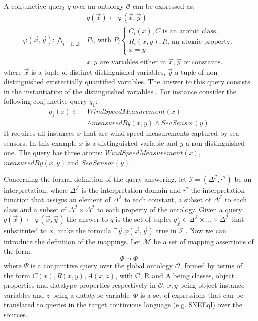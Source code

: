 A conjunctive query $q$ over an ontology $\mathcal{O}$ can be expressed as:
\begin{align*}
&q(\vec{x}) \leftarrow \varphi(\vec{x},\vec{y}) \\
%
\varphi(\vec{x},\vec{y}):\underset{i=1...k}{\bigwedge} & P_i \mbox{, with } P_i \begin{cases} C_i(x),   C \mbox{ is an atomic class. } \\
  R_i(x,y),   R_i \mbox{ an atomic property.}\\ x=y
\end{cases}
\\& x,y \mbox{ are variables either in $\vec{x}, \vec{y}$ or constants.}
\end{align*}
%
where $\vec{x}$ is a tuple of distinct distinguished variables, $\vec{y}$ a tuple of non distinguished existentially
quantified variables. The answer to this query consists in the instantiation of the distinguished variables
\cite{Calvanese_05}. For instance consider the following conjunctive query $q_1$:
\begin{align*}
q_1(x) \leftarrow & WindSpeedMeasurement(x) \\
& \wedge measuredBy(x,y)\wedge SeaSensor(y)
\end{align*}
It requires all instances $x$ that are wind speed measurements captured by sea sensors. In this example $x$ is a distinguished variable and $y$ a non-distinguished one. The query has three atoms: $WindSpeedMeasurement(x)$, $measuredBy(x,y)$ and $SeaSensor(y)$.

Concerning the formal definition of the query answering, let $\mathcal{I}=(\Delta^\mathcal{I} ,\centerdot^\mathcal{I})$ be an interpretation, where $\Delta^\mathcal{I}$ is the interpretation domain and $\centerdot^\mathcal{I}$ the interpretation function that assigns an element of $\Delta^\mathcal{I}$ to each constant, a subset of $\Delta^\mathcal{I}$ to each class and a subset of $\Delta^\mathcal{I} \times \Delta^\mathcal{I}$ to each property of the ontology.
Given a query $q(\vec{x})\leftarrow \varphi(\vec{x},\vec{y})$ the answer to $q$ is the set of tuples $q^{\mathcal{I}}_{\vec{x}} \in \Delta^\mathcal{I} \times \dots \times \Delta^\mathcal{I}$ that substituted to $\vec{x}$, make the formula $\exists\vec{y}.\varphi(\vec{x},\vec{y})$ true in $\mathcal{I}$ \cite{Poggi_08,Lubyte_09}.
Now we can introduce the definition of the mappings. Let $\mathcal{M}$ be a set of mapping assertions of the form:
\begin{equation*}
\Psi \leadsto \Phi
\end{equation*}
where $\Psi$ is a conjunctive query over the global ontology $\mathcal{O}$, formed by terms of the form $C(x), R(x,y),
A(x,z)$, with C, R and A being classes, object properties and datatype properties respectively in $\mathcal{O}$; $x, y
$ being object instance variables and $z$ being a datatype variable. $\Phi$ is a set of expressions that can be
translated to queries in the target continuous language (e.g. SNEEql) over the sources.
\\

